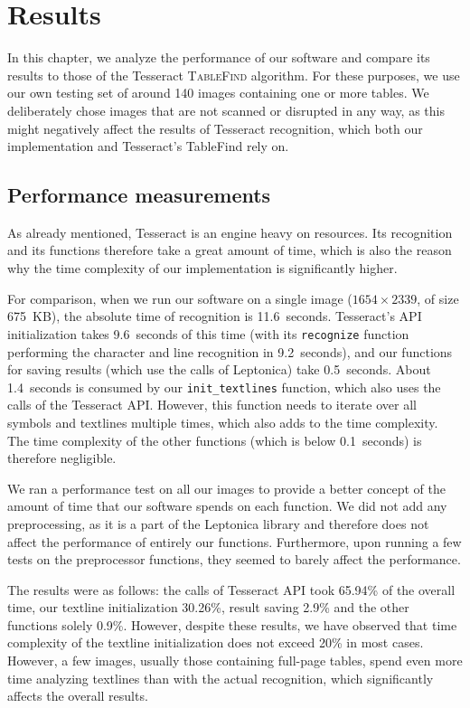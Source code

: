 \chapter{Results}

In this chapter, we analyze the performance of our software and compare its results to those of the Tesseract \textsc{TableFind} algorithm. For these purposes, we use our own testing set of around 140 images containing one or more tables. We deliberately chose images that are not scanned or disrupted in any way, as this might negatively affect the results of Tesseract recognition, which both our implementation and Tesseract's TableFind rely on.

\section{Performance measurements}

As already mentioned, Tesseract is an engine heavy on resources. Its recognition and its functions therefore take a great amount of time, which is also the reason why the time complexity of our implementation is significantly higher.

For comparison, when we run our software on a single image ($1654\times2339$, of size 675~KB), the absolute time of recognition is 11.6~seconds. Tesseract's API initialization takes 9.6~seconds of this time (with its \texttt{recognize} function performing the character and line recognition in 9.2~seconds), and our functions for saving results (which use the calls of Leptonica) take 0.5~seconds. About 1.4~seconds is consumed by our \texttt{init\_textlines} function, which also uses the calls of the Tesseract API. However, this function needs to iterate over all symbols and textlines multiple times, which also adds to the time complexity. The time complexity of the other functions (which is below 0.1~seconds) is therefore negligible.

We ran a performance test on all our images to provide a better concept of the amount of time that our software spends on each function. We did not add any preprocessing, as it is a part of the Leptonica library and therefore does not affect the performance of entirely our functions. Furthermore, upon running a few tests on the preprocessor functions, they seemed to barely affect the performance.

The results were as follows: the calls of Tesseract API took 65.94\% of the overall time, our textline initialization 30.26\%, result saving 2.9\% and the other functions solely 0.9\%. However, despite these results, we have observed that time complexity of the textline initialization does not exceed 20\% in most cases. However, a few images, usually those containing full-page tables, spend even more time analyzing textlines than with the actual recognition, which significantly affects the overall results.

